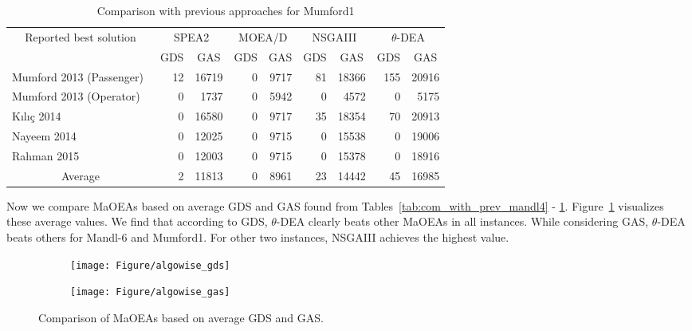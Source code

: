 \begin{table}[!htbp]
	\centering
	\caption{Comparison with previous approaches for Mumford1}
	\begin{tabular}{|l|r|r||r|r||r|r||r|r|}
		\hline
		\multicolumn{1}{|c|}{\multirow{2}[4]{*}{Reported best solution}} & \multicolumn{2}{c||}{SPEA2} & \multicolumn{2}{c||}{MOEA/D} & \multicolumn{2}{c||}{NSGAIII} & \multicolumn{2}{c|}{$\theta$-DEA} \\
		\cline{2-9}    \multicolumn{1}{|c|}{} & \multicolumn{1}{c|}{GDS} & \multicolumn{1}{c||}{GAS} & \multicolumn{1}{c|}{GDS} & \multicolumn{1}{c||}{GAS} & \multicolumn{1}{c|}{GDS} & \multicolumn{1}{c||}{GAS} & \multicolumn{1}{c|}{GDS} & \multicolumn{1}{c|}{GAS} \\
		\hline
		Mumford 2013 (Passenger)~\cite{mumford2013new} & 12    & 16719 & 0     & 9717  & 81    & 18366 & 155   & 20916 \\
		\hline
		Mumford 2013 (Operator)~\cite{mumford2013new} & 0     & 1737  & 0     & 5942  & 0     & 4572  & 0     & 5175 \\
		\hline
		K{\i}l{\i}{\c{c}} 2014~\cite{kilicc2014demand} & 0     & 16580 & 0     & 9717  & 35    & 18354 & 70    & 20913 \\
		\hline
		Nayeem 2014~\cite{nayeem2014transit} & 0     & 12025 & 0     & 9715  & 0     & 15538 & 0     & 19006 \\
		\hline
		Rahman 2015~\cite{rahman2015transit} & 0     & 12003 & 0     & 9715  & 0     & 15378 & 0     & 18916 \\
		\hline
		\hline
		\multicolumn{1}{|c|}{Average} & 2     & 11813 & 0     & 8961  & 23    & 14442 & 45    & 16985 \\
		\hline
	\end{tabular}%
	\label{tab:com_with_prev_m1}%
\end{table}%

Now we compare MaOEAs based on average GDS and GAS found from Tables~\ref{tab:com_with_prev_mandl4} - \ref{tab:com_with_prev_m1}. Figure~\ref{fig:algowise_gds_gas} visualizes these average values. We find that according to GDS, $\theta$-DEA clearly beats other MaOEAs in all instances. While considering GAS, $\theta$-DEA beats others for Mandl-6 and Mumford1. For other two instances, NSGAIII achieves the highest value.

\begin{figure}[!htbp]
	\centering
	\begin{subfigure}[b]{0.51\textwidth}
		\texttt{[image: Figure/algowise\_gds]}
	\end{subfigure}%
	\begin{subfigure}[b]{0.51\textwidth}
		\texttt{[image: Figure/algowise\_gas]}
	\end{subfigure}%
	\caption{Comparison of MaOEAs based on average GDS and GAS.}
	\label{fig:algowise_gds_gas}
\end{figure}

